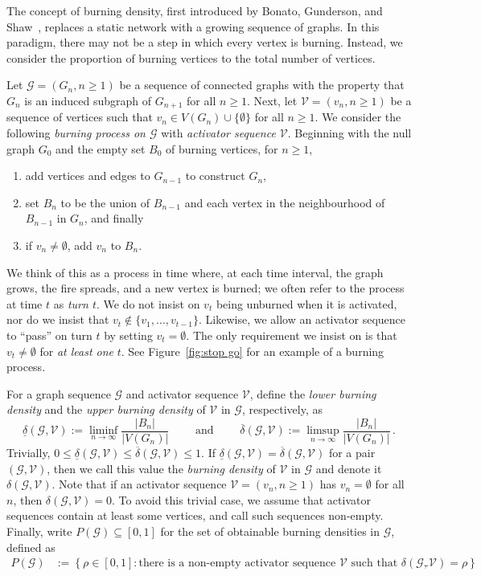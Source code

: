 \documentclass[12pt]{article}
\theoremstyle{remark}
\newcommand\cG{\mathcal G}
\newcommand\cV{\mathcal V}
\newcommand{\ld}[2]{\ensuremath{\underline{\delta}\left(#1,#2\right)}}
\newcommand{\ud}[2]{\ensuremath{\overline{\delta}\left(#1,#2\right)}}
\begin{document}
The concept of burning density, first introduced by Bonato, Gunderson, and Shaw~\cite{BGS20}, replaces a static network with a growing sequence of graphs. In this paradigm, there may not be a step in which every vertex is burning. Instead, we consider the proportion of burning vertices to the total number of vertices.

Let $\cG = (G_n, n \geq 1)$ be a sequence of connected graphs with the property that $G_n$ is an induced subgraph of $G_{n+1}$ for all $n \geq 1$. Next, let $\cV = (v_n, n \geq 1)$ be a sequence of vertices such that $v_n \in V(G_n) \cup \{\emptyset\}$ for all $n \geq 1$. We consider the following \emph{burning process on $\cG$} with \emph{activator sequence $\cV$}. Beginning with the null graph $G_0$ and the empty set $B_0$ of burning vertices, for $n \geq 1$, 
\begin{enumerate}
\item add vertices and edges to $G_{n-1}$ to construct $G_n$,
\item set $B_n$ to be the union of $B_{n-1}$ and each vertex in the neighbourhood of $B_{n-1}$ in $G_n$, and finally
\item if $v_n \neq \emptyset$, add $v_n$ to $B_n$.
\end{enumerate}
We think of this as a process in time where, at each time interval, the graph grows, the fire spreads, and a new vertex is burned; we often refer to the process at time $t$ as \emph{turn $t$}. We do not insist on $v_t$ being unburned when it is activated, nor do we insist that $v_t \notin \{ v_1,\dots,v_{t-1}\}$. Likewise, we allow an activator sequence to ``pass'' on turn $t$ by setting $v_t = \emptyset$. The only requirement we insist on is that $v_t \neq \emptyset$ for \emph{at least one} $t$. See Figure~\ref{fig:stop go} for an example of a burning process.

For a graph sequence $\cG$ and activator sequence $\cV$, define the \emph{lower burning density} and the \emph{upper burning density} of $\cV$ in $\cG$, respectively, as 
\[
\ld{\cG}{\cV}
:= 
\liminf_{n \to \infty} \frac{|B_n|}{|V(G_n)|}
\qquad \text{ and } \qquad
\ud{\cG}{\cV}
:= 
\limsup_{n \to \infty} \frac{|B_n|}{|V(G_n)|} \,.
\]
Trivially, $0 \le \underline{\delta}(\cG,\cV) \le \overline{\delta}(\cG,\cV) \le 1$. If $\underline{\delta}(\cG,\cV) = \overline{\delta}(\cG,\cV)$ for a pair $(\cG,\cV)$, then we call this value the \emph{burning density} of $\cV$ in $\cG$ and denote it $\delta(\cG,\cV)$. Note that if an activator sequence $\cV = (v_n, n\ge 1)$ has $v_n = \emptyset$ for all $n$, then $\delta(\cG, \cV) = 0$.  To avoid this trivial case, we assume that activator sequences contain at least some vertices, and call such sequences non-empty.  Finally, write $P(\cG) \subseteq [0,1]$ for the set of obtainable burning densities in $\cG$, defined as 
\begin{align*}
P(\cG) &:= \left\{ \rho \in [0,1] : \text{there is a non-empty activator sequence } \cV \text{ such that } \delta(\cG,\cV) = \rho \right\}.
\end{align*}
\end{document}
